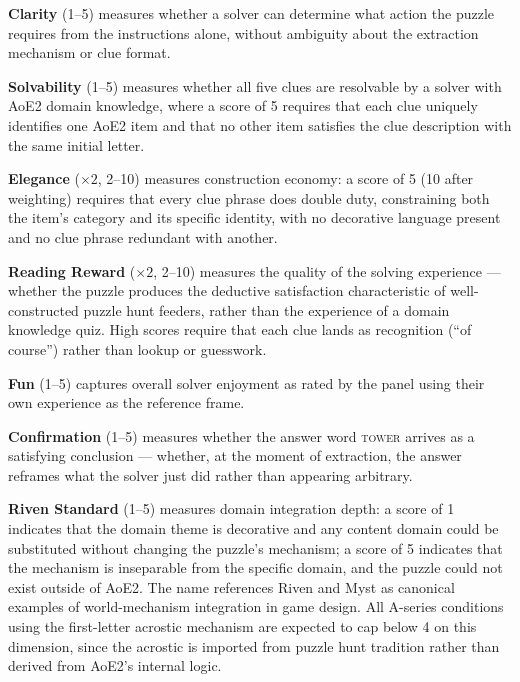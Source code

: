 \textbf{Clarity} (1--5) measures whether a solver can determine what action the puzzle requires from the instructions alone, without ambiguity about the extraction mechanism or clue format.

\textbf{Solvability} (1--5) measures whether all five clues are resolvable by a solver with AoE2 domain knowledge, where a score of 5 requires that each clue uniquely identifies one AoE2 item and that no other item satisfies the clue description with the same initial letter.

\textbf{Elegance} ($\times 2$, 2--10) measures construction economy: a score of 5 (10 after weighting) requires that every clue phrase does double duty, constraining both the item's category and its specific identity, with no decorative language present and no clue phrase redundant with another.

\textbf{Reading Reward} ($\times 2$, 2--10) measures the quality of the solving experience --- whether the puzzle produces the deductive satisfaction characteristic of well-constructed puzzle hunt feeders, rather than the experience of a domain knowledge quiz. High scores require that each clue lands as recognition (``of course'') rather than lookup or guesswork.

\textbf{Fun} (1--5) captures overall solver enjoyment as rated by the panel using their own experience as the reference frame.

\textbf{Confirmation} (1--5) measures whether the answer word \textsc{tower} arrives as a satisfying conclusion --- whether, at the moment of extraction, the answer reframes what the solver just did rather than appearing arbitrary.

\textbf{Riven Standard} (1--5) measures domain integration depth: a score of 1 indicates that the domain theme is decorative and any content domain could be substituted without changing the puzzle's mechanism; a score of 5 indicates that the mechanism is inseparable from the specific domain, and the puzzle could not exist outside of AoE2. The name references Riven and Myst as canonical examples of world-mechanism integration in game design. All A-series conditions using the first-letter acrostic mechanism are expected to cap below 4 on this dimension, since the acrostic is imported from puzzle hunt tradition rather than derived from AoE2's internal logic.

